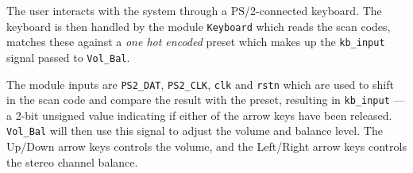 The user interacts with the system through a PS/2-connected keyboard. The keyboard is then handled by the module \verb?Keyboard? which reads the scan codes, matches these against a \emph{one hot encoded} preset which makes up the \verb?kb_input? signal passed to \verb?Vol_Bal?.

The module inputs are \verb=PS2_DAT=, \verb=PS2_CLK=, \verb=clk= and \verb=rstn= which are used to shift in the scan code and compare the result with the preset, resulting in \verb=kb_input= --- a 2-bit unsigned value indicating if either of the arrow keys have been released. \verb=Vol_Bal= will then use this signal to adjust the volume and balance level. The Up/Down arrow keys controls the volume, and the Left/Right arrow keys controls the stereo channel balance.
